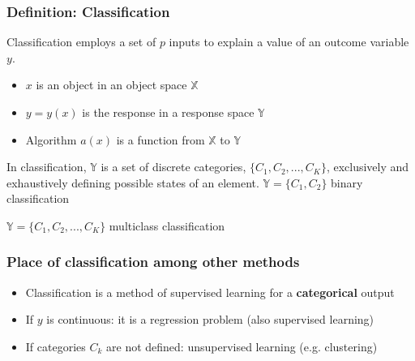\documentclass{beamer}
\begin{document}
\begin{frame}
	\frametitle{Definition: Classification}
	
	Classification employs a set of $p$ inputs to explain a value of an outcome 
	variable $y$.
		\vspace{0.2cm}
	\begin{itemize}
		\item $x$ is an object in an object space $\mathbb{X}$	
		\vspace{0.2cm}
		\item $y = y(x)$ is the response in a response space $\mathbb{Y}$
			\vspace{0.2cm}
		\item Algorithm $a(x)$ is a function from $\mathbb{X}$ to $\mathbb{Y}$
	\end{itemize}
	
	
	
	
	
	
	
	\vspace{0.3cm}
	
	In classification, $\mathbb{Y}$ is a set of discrete categories, $\{C_1, C_2, 
	..., 
	C_K\}$, exclusively and exhaustively defining possible states of an element.
		\vspace{0.2cm}
	$\mathbb{Y} = \{C_1, C_2\}$ binary classification
	
	$\mathbb{Y} = \{C_1, C_2, ..., C_K\}$ multiclass classification
	
\end{frame}





\begin{frame}
	\frametitle{Place of classification among other methods}
	
	\begin{itemize}
		
		\item Classification is a method of supervised learning for a \textbf{categorical} 
		output
			\vspace{0.2cm}
		\item If $y$ is continuous: it is a regression problem (also supervised learning)
			\vspace{0.2cm}
		
		\item If categories $C_k$ are not defined: unsupervised learning (e.g. 
		clustering) 	
	\end{itemize}
\end{frame}
\end{document}
